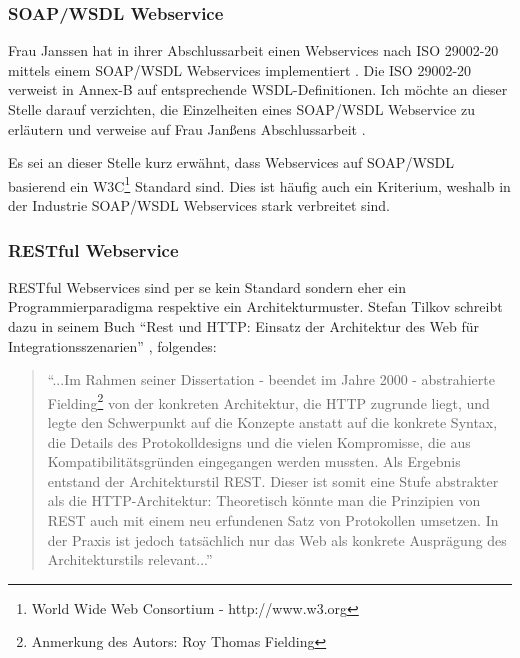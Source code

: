 \subsubsection{SOAP/WSDL Webservice}
Frau Janssen hat in ihrer Abschlussarbeit einen \glspl{Webservice} nach ISO 29002-20 mittels einem  \gls{SOAP}/\gls{WSDL} \glspl{Webservice} implementiert \citep[vgl.][]{janssen}. Die ISO 29002-20 verweist in Annex-B auf entsprechende \gls{WSDL}-Definitionen. 
Ich möchte an dieser Stelle darauf verzichten, die Einzelheiten eines SOAP/WSDL Webservice zu erläutern und verweise auf Frau Janßens Abschlussarbeit \citep[vgl.][Kap. 3]{janssen}. 

Es sei an dieser Stelle kurz erwähnt, dass \glspl{Webservice} auf \gls{SOAP}/\gls{WSDL} basierend ein W3C\footnote{World Wide Web Consortium - http://www.w3.org} Standard sind. Dies ist häufig auch ein Kriterium, weshalb in der Industrie \gls{SOAP}/\gls{WSDL} \glspl{Webservice} stark verbreitet sind. 

\subsubsection{RESTful Webservice}  
\gls{REST}ful Webservices sind per se kein Standard sondern eher ein Programmierparadigma respektive ein Architekturmuster. 
Stefan Tilkov schreibt dazu in seinem Buch \enquote{Rest und HTTP: Einsatz der Architektur des Web für Integrationsszenarien} \citep[S.10][]{tilkovrest}, folgendes:

\begin{quotation}
\enquote{...Im Rahmen seiner Dissertation - beendet im Jahre 2000 - abstrahierte Fielding\footnote{Anmerkung des Autors: Roy Thomas Fielding} von der konkreten Architektur, die \gls{HTTP} zugrunde liegt, und legte den Schwerpunkt auf die Konzepte anstatt auf die konkrete Syntax, die Details des Protokolldesigns und die vielen Kompromisse, die aus Kompatibilitätsgründen eingegangen werden mussten. Als Ergebnis entstand der Architekturstil \gls{REST}. Dieser ist somit eine Stufe abstrakter als die \gls{HTTP}-Architektur: Theoretisch könnte man die Prinzipien von \gls{REST} auch mit einem neu erfundenen Satz von Protokollen umsetzen. In der Praxis ist jedoch tatsächlich nur das Web als konkrete Ausprägung des Architekturstils relevant...}
\end{quotation}
\citep[Vgl. auch][]{fieldingrest}

